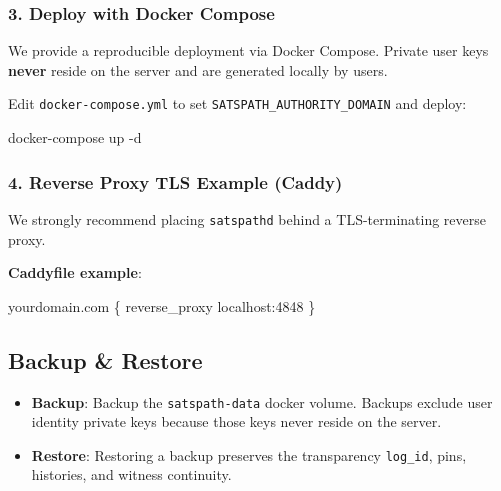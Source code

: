 \documentclass[
]{article}
\newenvironment{Shaded}{}{}
\newcommand{\AttributeTok}[1]{\textcolor[rgb]{0.49,0.56,0.16}{#1}}
\newcommand{\ExtensionTok}[1]{#1}
\newcommand{\NormalTok}[1]{#1}
\providecommand{\tightlist}{%
  \setlength{\itemsep}{0pt}\setlength{\parskip}{0pt}}
\begin{document}
\hypertarget{deploy-with-docker-compose}{%
\subsubsection{3. Deploy with Docker
Compose}\label{deploy-with-docker-compose}}

We provide a reproducible deployment via Docker Compose. Private user
keys \textbf{never} reside on the server and are generated locally by
users.

Edit \texttt{docker-compose.yml} to set
\texttt{SATSPATH\_AUTHORITY\_DOMAIN} and deploy:

\begin{Shaded}
\begin{Highlighting}[]
\ExtensionTok{docker{-}compose}\NormalTok{ up }\AttributeTok{{-}d}
\end{Highlighting}
\end{Shaded}

\hypertarget{reverse-proxy-tls-example-caddy}{%
\subsubsection{4. Reverse Proxy TLS Example
(Caddy)}\label{reverse-proxy-tls-example-caddy}}

We strongly recommend placing \texttt{satspathd} behind a
TLS-terminating reverse proxy.

\textbf{Caddyfile example}:

\begin{Shaded}
\begin{Highlighting}[]
\NormalTok{yourdomain.com \{}
\NormalTok{    reverse\_proxy localhost:4848}
\NormalTok{\}}
\end{Highlighting}
\end{Shaded}

\hypertarget{backup-restore}{%
\subsection{Backup \& Restore}\label{backup-restore}}

\begin{itemize}
\tightlist
\item
  \textbf{Backup}: Backup the \texttt{satspath-data} docker volume.
  Backups exclude user identity private keys because those keys never
  reside on the server.
\item
  \textbf{Restore}: Restoring a backup preserves the transparency
  \texttt{log\_id}, pins, histories, and witness continuity.
\end{itemize}
\end{document}
